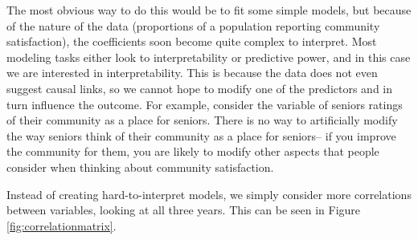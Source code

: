 \documentclass[smallextended]{svjour3}\usepackage[]{graphicx}\usepackage[]{color}
\begin{document}
The most obvious way to do this would be to fit some simple models, but because of the nature of the data (proportions of a population reporting community satisfaction), the coefficients soon become quite complex to interpret. Most modeling tasks either look to interpretability or predictive power, and in this case we are interested in interpretability. This is because the data does not even suggest causal links, so we cannot hope to modify one of the predictors and in turn influence the outcome. For example, consider the variable of seniors ratings of their community as a place for seniors. There is no way to artificially modify the way seniors think of their community as a place for seniors-- if you improve the community for them, you are likely to modify other aspects that people consider when thinking about community satisfaction. 

Instead of creating hard-to-interpret models, we simply consider more correlations between variables, looking at all three years. This can be seen in Figure \ref{fig:correlationmatrix}. 
\end{document}
